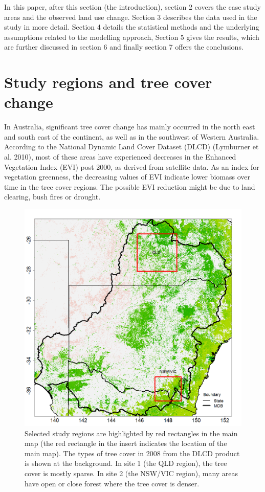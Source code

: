 \documentclass[fleqn,10pt,lineno]{wlpeerj} %
\begin{document}
In this paper, after this section (the introduction), section 2 covers
the case study areas and the observed land use change. Section 3
describes the data used in the study in more detail. Section 4 details
the statistical methods and the underlying assumptions related to the
modelling approach, Section 5 gives the results, which are further
discussed in section 6 and finally section 7 offers the conclusions.

\section{Study regions and tree cover
change}\label{study-regions-and-tree-cover-change}

In Australia, significant tree cover change has mainly occurred in the
north east and south east of the continent, as well as in the southwest
of Western Australia. According to the National Dynamic Land Cover
Dataset (DLCD) (Lymburner et al. 2010), most of these areas have
experienced decreases in the Enhanced Vegetation Index (EVI) post 2000,
as derived from satellite data. As an index for vegetation greenness,
the decreasing values of EVI indicate lower biomass over time in the
tree cover regions. The possible EVI reduction might be due to land
clearing, bush fires or drought.

\begin{figure}
\includegraphics[width=0.9\linewidth]{figures/map_selreg} \caption{Selected study regions are highlighted by red rectangles in the main map (the red rectangle in the insert indicates the location of the main map). The types of tree cover in 2008 from the DLCD product is shown at the background. In site 1 (the QLD region), the tree cover is mostly sparse. In site 2 (the NSW/VIC region), many areas have open or close forest where the tree cover is denser.}\label{fig:selreg}
\end{figure}
\end{document}
